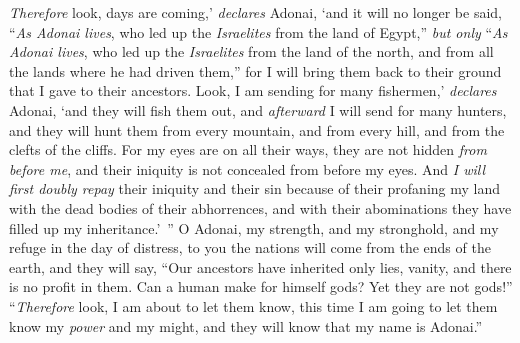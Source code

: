 \begin{biblechapter}
 \textit{Therefore} look, days are coming,’ \textit{declares} Adonai, ‘and it will no longer be said, “\textit{As Adonai lives}, who led up the \textit{Israelites} from the land of Egypt,”
\verse \textit{but only} “\textit{As Adonai lives}, who led up the \textit{Israelites} from the land of the north, and from all the lands where he had driven them,” for I will bring them back to their ground that I gave to their ancestors.
\verse Look, I am sending for many fishermen,’ \textit{declares} Adonai, ‘and they will fish them out, and \textit{afterward} I will send for many hunters, and they will hunt them from every mountain, and from every hill, and from the clefts of the cliffs.
\verse For my eyes are on all their ways, they are not hidden \textit{from before me}, and their iniquity is not concealed from before my eyes.
\verse And \textit{I will first doubly repay} their iniquity and their sin because of their profaning my land with the dead bodies of their abhorrences, and with their abominations they have filled up my inheritance.’ ”
\verse O Adonai, my strength, and my stronghold, 
and my refuge in the day of distress, 
to you the nations will come from the ends of the earth, 
and they will say, “Our ancestors have inherited only lies, 
vanity, and there is no profit in them.
\verse Can a human make for himself gods? 
Yet they are not gods!”
\verse “\textit{Therefore} look, I am about to let them know, 
this time I am going to let them know 
my \textit{power} and my might, 
and they will know that my name is Adonai.”
\end{biblechapter}

